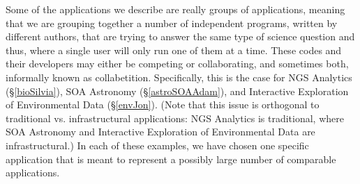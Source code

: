 Some of the applications we describe are really groups of
applications, meaning that we are grouping together a number of
independent programs, written by different authors, that are trying to
answer the same type of science question and thus, where a single user
will only run one of them at a time.  %
These codes and their developers may either be
competing or collaborating, and sometimes both, informally known as
collabetition. Specifically, this is the case for NGS Analytics
(\S\ref{bioSilvia}), SOA Astronomy (\S\ref{astroSOAAdam}), and
Interactive Exploration of Environmental Data (\S\ref{envJon}).  (Note
that this issue is orthogonal to traditional vs. infrastructural applications:
NGS Analytics is traditional, where SOA Astronomy and Interactive
Exploration of Environmental Data are infrastructural.)  In
each of these examples, we have chosen one specific application that
is meant to represent a possibly large number of comparable
applications.



